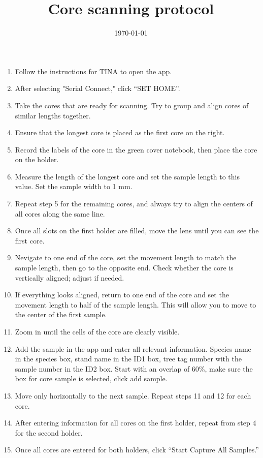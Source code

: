 \documentclass[11pt,letter]{article}
\begin{document}
\title{Core scanning protocol} 
\date{\today}
\maketitle

\setlength{\parindent}{0pt}
\setlength{\parskip}{3pt}
\begin{enumerate}
\item Follow the instructions for TINA to open the app.
\item After selecting "Serial Connect," click ``SET HOME''.
\item Take the cores that are ready for scanning. Try to group and align cores of similar lengths together.
\item Ensure that the longest core is placed as the first core on the right.
\item Record the labels of the core in the green cover notebook, then place the core on the holder.
\item Measure the length of the longest core and set the sample length to this value. Set the sample width to 1 mm.
\item Repeat step 5 for the remaining cores, and always try to align the centers of all cores along the same line.
\item Once all slots on the first holder are filled, move the lens until you can see the first core.
\item Nevigate to one end of the core, set the movement length to match the sample length, then go to the opposite end. Check whether the core is vertically aligned; adjust if needed.
\item If everything looks aligned, return to one end of the core and set the movement length to half of the sample length. This will allow you to move to the center of the first sample.
\item Zoom in until the cells of the core are clearly visible.
\item Add the sample in the app and enter all relevant information. Species name in the species box, stand name in the ID1 box, tree tag number with the sample number in the ID2 box. Start with an overlap of 60\%, make sure the box for core sample is selected, click add sample.
\item Move only horizontally to the next sample. Repeat steps 11 and 12 for each core.
\item After entering information for all cores on the first holder, repeat from step 4 for the second holder.
\item Once all cores are entered for both holders, click “Start Capture All Samples.”

\end{enumerate}
\end{document}

